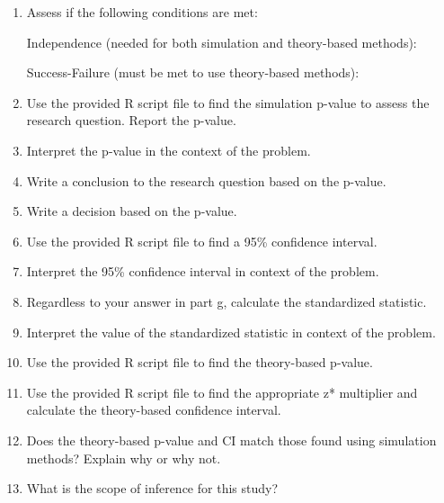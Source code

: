 \documentclass[
]{report}
\begin{document}
\begin{enumerate}
\def\labelenumi{\alph{enumi}.}
\setcounter{enumi}{6}
\item
  Assess if the following conditions are met:

  Independence (needed for both simulation and theory-based methods):
  \vspace{0.8in}

  Success-Failure (must be met to use theory-based methods):
  \vspace{0.8in}
\item
  Use the provided R script file to find the simulation p-value to assess the research question. Report the p-value.
  \vspace{0.3in}
\item
  Interpret the p-value in the context of the problem.
  \vspace{0.8in}
\item
  Write a conclusion to the research question based on the p-value.
  \vspace{0.8in}
\item
  Write a decision based on the p-value.
  \vspace{0.3in}
\item
  Use the provided R script file to find a 95\% confidence interval.
  \vspace{0.3in}
\item
  Interpret the 95\% confidence interval in context of the problem.
  \vspace{0.8in}
\item
  Regardless to your answer in part g, calculate the standardized statistic.
  \vspace{0.4in}
\item
  Interpret the value of the standardized statistic in context of the problem.
  \vspace{0.8in}
\item
  Use the provided R script file to find the theory-based p-value.
  \vspace{0.3in}
\item
  Use the provided R script file to find the appropriate z* multiplier and calculate the theory-based confidence interval.
  \vspace{0.5in}
\item
  Does the theory-based p-value and CI match those found using simulation methods? Explain why or why not.
  \vspace{0.8in}
\item
  What is the scope of inference for this study?
  \vspace{0.8in}
\end{enumerate}
\end{document}
